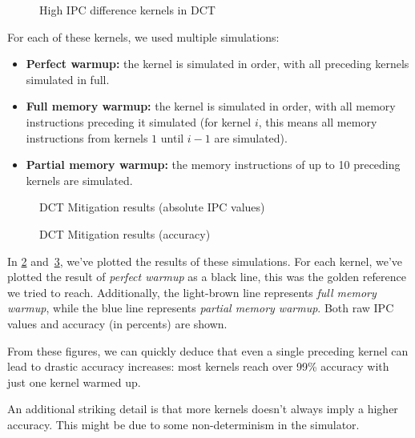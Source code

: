\begin{figure}
    \centering
    
    \caption{High IPC difference kernels in DCT}
    \label{fig:dct_kernels}
\end{figure}

For each of these kernels, we used multiple simulations:
\begin{itemize}
    \item \textbf{Perfect warmup:} the kernel is simulated in order, with all preceding kernels simulated in full.
    \item \textbf{Full memory warmup:} the kernel is simulated in order, with all memory instructions preceding it simulated (for kernel $i$, this means all memory instructions from kernels $1$ until $i - 1$ are simulated).
    \item \textbf{Partial memory warmup:} the memory instructions of up to 10 preceding kernels are simulated.
\end{itemize}

\begin{figure}
    \centering
    \resizebox{0.45\textwidth}{!}{}
    \resizebox{0.45\textwidth}{!}{}
    \resizebox{0.45\textwidth}{!}{}
    \resizebox{0.45\textwidth}{!}{}
    
    \caption{DCT Mitigation results (absolute IPC values)}
    \label{fig:mitig_abs}
\end{figure}

\begin{figure}
    \centering
    \resizebox{0.45\textwidth}{!}{}
    \resizebox{0.45\textwidth}{!}{}
    \resizebox{0.45\textwidth}{!}{}
    \resizebox{0.45\textwidth}{!}{}
    
    \caption{DCT Mitigation results (accuracy)}
    \label{fig:mitig_acc}
\end{figure}

In \cref{fig:mitig_abs} and\ \ref{fig:mitig_acc}, we've plotted the results of these simulations.
For each kernel, we've plotted the result of \textit{perfect warmup} as a black line, this was the golden reference we tried to reach.
Additionally, the light-brown line represents \textit{full memory warmup}, while the blue line represents \textit{partial memory warmup}.
Both raw IPC values and accuracy (in percents) are shown.

From these figures, we can quickly deduce that even a single preceding kernel can lead to drastic accuracy increases: most kernels reach over 99\% accuracy with just one kernel warmed up.

An additional striking detail is that more kernels doesn't always imply a higher accuracy.
This might be due to some non-determinism in the simulator.

